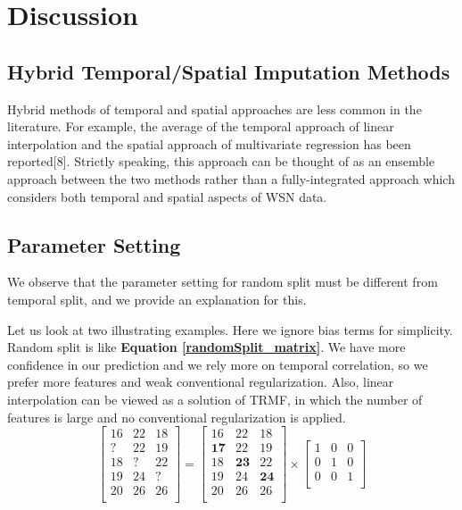 \section{Discussion}  \label{sec:disc}

\subsection{Hybrid Temporal/Spatial Imputation Methods}

Hybrid methods of temporal and spatial approaches are less common in the literature.
For example, the average of the temporal approach of linear interpolation and the spatial approach of multivariate regression has been reported[8].
Strictly speaking, this approach can be thought of as an ensemble approach between the two methods rather than a fully-integrated approach which considers both temporal and spatial aspects of WSN data.

\subsection{Parameter Setting} \label{subsec:parameter}

We observe that the parameter setting for random split must be different from temporal split, and we provide an explanation for this. 

Let us look at two illustrating examples. Here we ignore bias terms for simplicity. Random split is like \textbf{Equation \ref{randomSplit_matrix}}. We have more confidence in our prediction and we rely more on temporal correlation, so we prefer more features and weak conventional regularization. Also, linear interpolation can be viewed as a solution of TRMF, in which the number of features is large and no conventional regularization is applied. 
\begin{equation}
\label{randomSplit_matrix}
\begin{bmatrix}
16 & 22 & 18\\
 ? & 22 & 19\\
18 &  ?	& 22\\
19 & 24 &  ?\\
20 & 26 & 26\\
\end{bmatrix} 
= 
\begin{bmatrix}
16 & 22 & 18\\
\mathbf{17} & 22 & 19\\
18 & \mathbf{23}	& 22\\
19 & 24 & \mathbf{24}\\
20 & 26 & 26\\
\end{bmatrix} 
\times
\begin{bmatrix}
1 & 0 & 0\\
0 & 1 & 0\\
0 & 0 & 1\\
\end{bmatrix} 
\end{equation}

